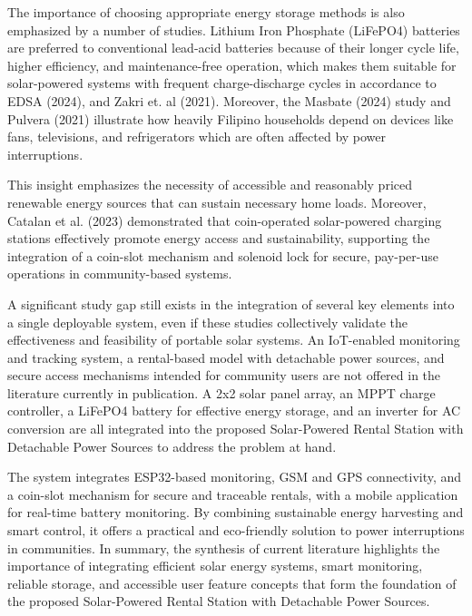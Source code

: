 {The importance of choosing appropriate energy storage methods is also emphasized by a number of studies. Lithium Iron Phosphate (LiFePO4) batteries are preferred to conventional lead-acid batteries because of their longer cycle life, higher efficiency, and maintenance-free operation, which makes them suitable for solar-powered systems with frequent charge-discharge cycles in accordance to EDSA (2024), and Zakri et. al (2021). Moreover, the Masbate (2024) study and Pulvera (2021) illustrate how heavily Filipino households depend on devices like fans, televisions, and refrigerators which are often affected by power interruptions. 


This insight emphasizes the necessity of accessible and reasonably priced renewable energy sources that can sustain necessary home loads. Moreover, Catalan et al. (2023) demonstrated that coin-operated solar-powered charging stations effectively promote energy access and sustainability, supporting the integration of a coin-slot mechanism and solenoid lock for secure, pay-per-use operations in community-based systems.

A significant study gap still exists in the integration of several key elements into a single deployable system, even if these studies collectively validate the effectiveness and feasibility of portable solar systems.	An IoT-enabled monitoring and tracking system, a rental-based model with detachable power sources, and secure access mechanisms intended for community users are not offered in the literature currently in publication. A 2x2 solar panel array, an MPPT charge controller, a LiFePO4 battery for effective energy storage, and an inverter for AC conversion are all integrated into the proposed Solar-Powered Rental Station with Detachable Power Sources to address the problem at hand. 

The system integrates ESP32-based monitoring, GSM and GPS connectivity, and a coin-slot mechanism for secure and traceable rentals, with a mobile application for real-time battery monitoring. By combining sustainable energy harvesting and smart control, it offers a practical and eco-friendly solution to power interruptions in communities. In summary, the synthesis of current literature highlights the importance of integrating efficient solar energy systems, smart monitoring, reliable storage, and accessible user feature concepts that form the foundation of the proposed Solar-Powered Rental Station with Detachable Power Sources.



}